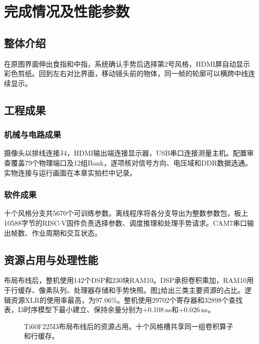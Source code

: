 \section{完成情况及性能参数}
\subsection{整体介绍}
在原图界面伸出食指和中指，系统确认手势后选择第2号风格，HDMI屏自动显示彩色剪纸。回到左右对比界面，移动镜头前的物体，同一帧的轮廓可以横跨中线连续显示。


\subsection{工程成果}
\subsubsection{机械与电路成果}
摄像头以排线连接J4，HDMI输出端连接显示器，USB串口连接测量主机。配置审查覆盖79个物理端口及12组Bank，逐项核对信号方向、电压域和DDR数据选通。实物连接与运行画面在本章实拍栏中记录。

\subsubsection{软件成果}
十个风格分支共5670个可训练参数。离线程序将各分支导出为整数参数包，板上10588字节的RISC-V固件负责选择参数、调度推理和处理手势请求。CAM7串口输出帧数、作业周期和交互状态。

\subsection{资源占用与处理性能}
布局布线后，整机使用142个DSP和230块RAM10。DSP承担卷积乘加，RAM10用于行缓存、像素队列、处理器存储和手势快照。图\ref{fig:utilization}给出三类主要资源的占比。逻辑资源XLR的使用率最高，为97.06\%。整机使用29702个寄存器和32898个查找表，I3时序模型下最小建立、保持余量分别为+0.108\,ns和+0.026\,ns。
\begin{figure}[H]\centering
{}
\caption{Ti60F225I3布局布线后的资源占用。十个风格槽共享同一组卷积算子和行缓存。}\label{fig:utilization}
\end{figure}

